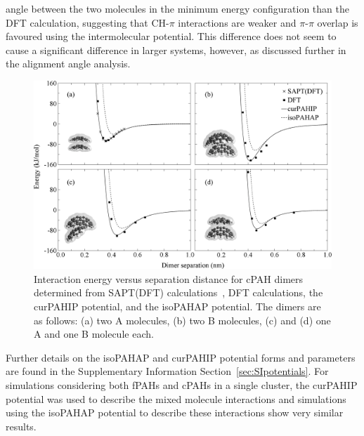 angle between the two molecules in the minimum energy configuration than the DFT calculation, suggesting that CH-$\pi$ interactions are weaker and $\pi$-$\pi$ overlap is favoured using the intermolecular potential.  This difference does not seem to cause a significant difference in larger systems, however, as discussed further in the alignment angle analysis. 
%
\begin{figure}[!tbh]
\centering
\includegraphics[width=1\linewidth]{Figures/potentialDFT_curves.eps}
\caption{Interaction energy versus separation distance for cPAH dimers determined from SAPT(DFT) calculations~\cite{Cabaleiro-Lago2018}, DFT calculations, the curPAHIP potential, and the isoPAHAP potential. The dimers are as follows: (a) two A molecules, (b) two B molecules, (c) and (d) one A and one B molecule each.}
\label{fig:potentialDFTcurves}
\end{figure}
%

Further details on the isoPAHAP and curPAHIP potential forms and parameters are found in the Supplementary Information Section~\ref{sec:SIpotentials}. For simulations considering both fPAHs and cPAHs in a single cluster, the curPAHIP potential was used to describe the mixed molecule interactions and simulations using the isoPAHAP potential to describe these interactions show very similar results.


